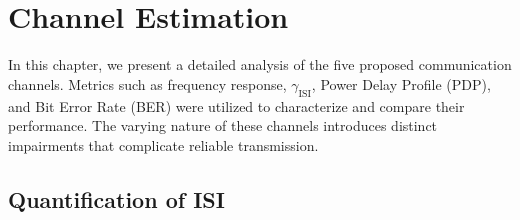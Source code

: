 \chapter{Channel Estimation} \label{ch:channel}

In this chapter, we present a detailed analysis of the five proposed communication channels.
Metrics such as frequency response, $\gamma_{\text{ISI}}$, Power Delay Profile (PDP), and Bit Error Rate (BER) were utilized to characterize and compare their performance.
The varying nature of these channels introduces distinct impairments that complicate reliable transmission.

\section{Quantification of ISI}%
\label{sec:ISI Characterization}

